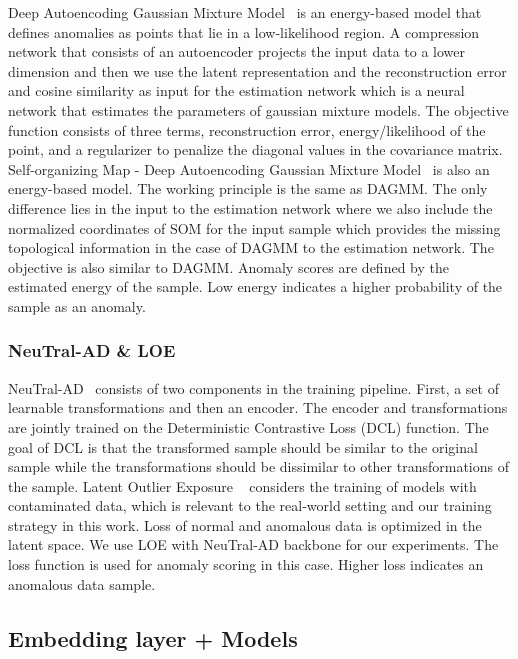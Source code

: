 \documentclass{article}
\begin{document}
Deep Autoencoding Gaussian Mixture Model~\citep{dagmm} is an energy-based model that defines anomalies as points that lie in a low-likelihood region. A compression network that consists of an autoencoder projects the input data to a lower dimension and then we use the latent representation and the reconstruction error and cosine similarity as input for the estimation network which is a neural network that estimates the parameters of gaussian mixture models. The objective function consists of three terms, reconstruction error, energy/likelihood of the point, and a regularizer to penalize the diagonal values in the covariance matrix. Self-organizing Map - Deep Autoencoding Gaussian Mixture Model~\citep{som} is also an energy-based model. The working principle is the same as DAGMM. The only difference lies in the input to the estimation network where we also include the normalized coordinates of SOM for the input sample which provides the missing topological information in the case of DAGMM to the estimation network. The objective is also similar to DAGMM. Anomaly scores are defined by the estimated energy of the sample. Low energy indicates a higher probability of the sample as an anomaly.

\subsubsection{NeuTral-AD \& LOE}

NeuTral-AD~\citep{qiu2021neural} consists of two components in the training pipeline. First, a set of learnable transformations and then an encoder. The encoder and transformations are jointly trained on the Deterministic Contrastive Loss (DCL) function. The goal of DCL is that the transformed sample should be similar to the original sample while the transformations should be dissimilar to other transformations of the sample.
Latent Outlier Exposure  ~\citep{qiu2022latent} considers the training of models with contaminated data, which is relevant to the real-world setting and our training strategy in this work. Loss of normal and anomalous data is optimized in the latent space. We use  LOE with NeuTral-AD backbone for our experiments. The loss function is used for anomaly scoring in this case. Higher loss indicates an anomalous data sample.


\subsection{Embedding layer + Models}\label{a4}
\end{document}
